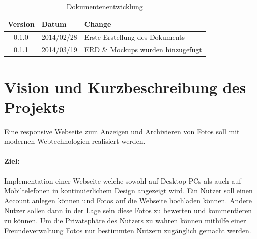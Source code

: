 \documentclass[a4paper,bibtotoc,oneside]{scrartcl}	%
\begin{document}
\newpage
\begin{table}[h]
	\centering
	\begin{tabular}{|c|l|l|}
		\hline
		\textbf{Version} & \textbf{Datum} & \textbf{Change} \\
		\hline
		0.1.0 & 2014/02/28 & Erste Erstellung des Dokuments \\
		\hline
		0.1.1 & 2014/03/19 & ERD \& Mockups wurden hinzugefügt \\
		\hline
	\end{tabular}

	\caption{Dokumentenentwicklung}
	\label{tab:Dokumentenentwicklung}
\end{table}

\newpage
\tableofcontents\thispagestyle{empty}
\newpage
\setcounter{page}{1}


\section{Vision und Kurzbeschreibung des Projekts}
	Eine responsive Webseite zum Anzeigen und Archivieren von Fotos soll 
	mit modernen Webtechnologien realisiert werden.
	\paragraph{Ziel:}
		Implementation einer Webseite welche sowohl auf Desktop PCs als
		auch auf Mobiltelefonen in kontinuierlichem Design angezeigt
		wird. Ein Nutzer soll einen Account anlegen können und Fotos auf
		die Webseite hochladen können. Andere Nutzer sollen dann in der
		Lage sein diese Fotos zu bewerten und kommentieren zu können.
		Um die Privatsphäre des Nutzers zu wahren können mithilfe einer
		Freundeverwaltung Fotos nur bestimmten Nutzern zugänglich 
		gemacht werden.
\end{document}
